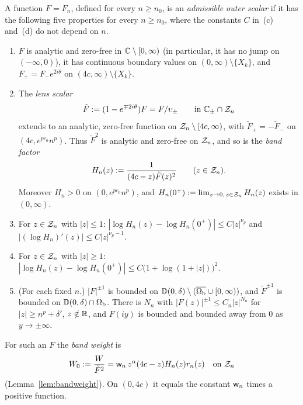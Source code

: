 \begin{definition}\label{def:outer-admissible}
A function $F=F_n$, defined for every $n\ge n_0$, is an \emph{admissible outer scalar} if it has the following five
properties for every $n\ge n_0$, where the constants $C$ in~(c) and~(d) do not depend on $n$.
\begin{enumerate}
\item[(a)] $F$ is analytic and zero-free in $\mathbb{C}\setminus[0,\infty)$ (in particular, it has no jump on $(-\infty,0)$),
  it has continuous boundary values on $(0,\infty)\setminus\{X_k\}$, and $F_+=F_-e^{2i\theta}$ on
  $(4c,\infty)\setminus\{X_k\}$.
\item[(b)] The \emph{lens scalar}
  \begin{equation}\label{eq:Ftilde}
    \tilde F:=(1-e^{\mp2i\theta})F=F/\upsilon_\pm\qquad\text{in }\mathbb{C}_\pm\cap\mathcal{Z}_n
  \end{equation}
  extends to an analytic, zero-free function on $\mathcal{Z}_n\setminus[4c,\infty)$, with $\tilde F_+=-\tilde F_-$ on
  $(4c,e^{pc_0}n^p)$. Thus $\tilde F^2$ is analytic and zero-free on $\mathcal{Z}_n$, and so is the \emph{band factor}
  \begin{equation}\label{eq:Hn}
    H_n(z):=\frac1{(4c-z)\tilde F(z)^2}\qquad(z\in\mathcal{Z}_n).
  \end{equation}
  Moreover $H_n>0$ on $(0,e^{pc_0}n^p)$, and $H_n(0^+):=\lim_{z\to0,\,z\in\mathcal{Z}_n}H_n(z)$ exists in $(0,\infty)$.
\item[(c)] For $z\in\mathcal{Z}_n$ with $|z|\le1$:
  $|\log H_n(z)-\log H_n(0^+)|\le C|z|^{\nu_p}$ and $|(\log H_n)'(z)|\le C|z|^{\nu_p-1}$.
\item[(d)] For $z\in\mathcal{Z}_n$ with $|z|\ge1$: $|\log H_n(z)-\log H_n(0^+)|\le C\bigl(1+\log(1+|z|)\bigr)^2$.
\item[(e)] (For each fixed $n$.) $|F|^{\pm1}$ is bounded on $\mathbb D(0,\delta)\setminus(\overline{\Omega_{\mathrm{b}}}\cup[0,\infty))$, and
  $\tilde F^{\pm1}$ is bounded on $\mathbb D(0,\delta)\cap\Omega_{\mathrm{b}}$. There is $N_n$ with $|F(z)|^{\pm1}\le C_n|z|^{N_n}$ for
  $|z|\ge n^p+\delta'$, $z\notin\mathbb{R}$, and $F(iy)$ is bounded and bounded away from $0$ as $y\to\pm\infty$.
\end{enumerate}
\end{definition}

For such an $F$ the \emph{band weight} is
\begin{equation}\label{eq:W0}
  W_0:=\frac W{\tilde F^2}=\mathsf w_n\,z^\alpha(4c-z)H_n(z)r_n(z)\quad\text{on }\mathcal{Z}_n
\end{equation}
(Lemma~\ref{lem:bandweight}). On $(0,4c)$ it equals the constant $\mathsf w_n$ times a positive function.

